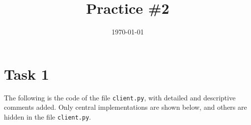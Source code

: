 \documentclass{homework}
\title{Practice \#2}
\date{\today}
\begin{document}
\maketitle

\vspace*{-4em}


\begin{figure}[H]
  \centering
  \vspace*{-3.5em}
  \hspace*{-0.13\textwidth}
\end{figure}

\section{Task 1}

The following is the code of the file \texttt{client.py}, with detailed and descriptive comments added. Only central implementations are shown below, and others are hidden in the file \texttt{client.py}.
\end{document}
